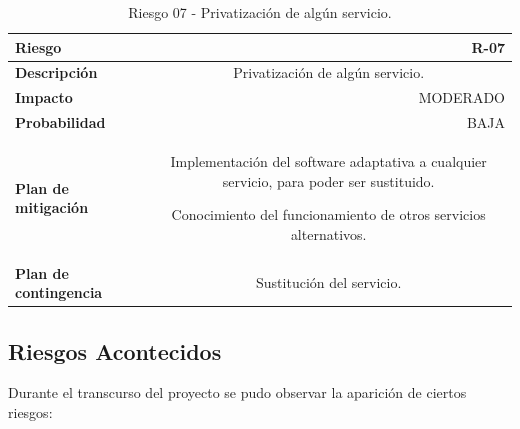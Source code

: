         \begin{table}[H]
        \centering
        \begin{tabular}{|l|c}
        \hline
        \textbf{Riesgo}               & \multicolumn{1}{r|}{R-07}                                             \\ \hline
        \textbf{Descripción}          & \multicolumn{1}{X|}{Privatización de algún servicio.}
        \\ \hline
        \textbf{Impacto}              & \multicolumn{1}{r|}{MODERADO}                                             \\ \hline
        \textbf{Probabilidad}         & \multicolumn{1}{r|}{BAJA}                                         \\ \hline
        \textbf{Plan de mitigación}   & \multicolumn{1}{X|}{ Implementación del software adaptativa a cualquier servicio, para poder ser sustituido.
        
        Conocimiento del funcionamiento de otros servicios alternativos. }
        \\ \hline
        \textbf{Plan de contingencia} & \multicolumn{1}{X|}{ Sustitución del servicio.}
        \\ \hline
        \end{tabular}
        \caption{Riesgo 07 - Privatización de algún servicio. }
        \label{table:riskpriv}
        \end{table}


    \newpage
    \subsection{Riesgos Acontecidos}
    
        Durante el transcurso del proyecto se pudo observar la aparición de ciertos riesgos:
        
